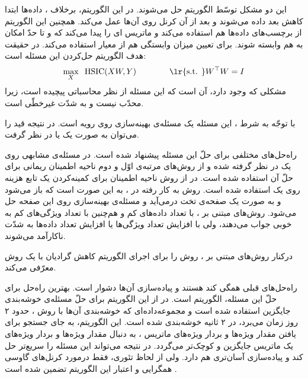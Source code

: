 این دو مشکل توسّط الگوریتم
حل می‌شوند. در این الگوریتم، برخلاف
،
داده‌ها ابتدا کاهش بعد داده می‌شوند و بعد از آن  کرنل روی آن‌ها عمل می‌کند. همچنین این الگوریتم از برچسب‌های داده‌ها هم استفاده می‌کند و ماتریس 
ای
را پیدا می‌کند که 
و
تا حدّ امکان به هم وابسته شوند. برای تعیین میزان وابستگی هم از معیار
\cite{gretton2005measuring} 
استفاده می‌کند. 
\cite{wu2018iterative,fukumizu2009kernel,barshan2011supervised, masaeli2010transformation,scholkopf1998nonlinear,niu2011dimensionality,gangeh2016semi,chang2017clustering,niu2010multiple,song2012feature}
در حقیقت هدف الگوریتم 
حل‌کردن این مسئله است:
\begin{equation}\label{eq1}
\max_X \;\; \HSIC(XW,Y) \qquad \qquad\text{\lr{s.t. }} W^\top W = I
\end{equation}
مشکلی که وجود دارد، آن‌ است که این مسئله از نظر محاسباتی پیچیده است، زیرا محدّب نیست و به شدّت غیرخطّی است. 

با توجّه به شرط
،
این مسئله یک مسئله‌ی بهینه‌سازی روی رویه است. در نتیجه قید را می‌توان به صورت یک
یا
در نظر گرفت. 
\cite{james1976topology,nishimori2005learning,edelman1998geometry}

راه‌حل‌های مختلفی برای حلّ این مسئله پیشنهاد شده است. در
\cite{boumal2011rtrmc} 
مسئله‌ی مشابهی روی یک
در نظر گرفته شده و از روش‌های مرتبه‌ی اوّل و دوم ناحیه اطمینان ریمانی
برای حلّ آن استفاده شده است. در 
\cite{theis2009soft}
از روش ناحیه اطمینان برای کمینه‌کردن یک تابع هزینه روی یک
استفاده شده است. روش به کار رفته در
\cite{wen2013feasible}،
به این صورت است که
باز می‌شود و به صورت یک صفحه‌ی تخت درمی‌آید و مسئله‌ی بهینه‌سازی روی این صفحه حل می‌شود. روش‌های مبتنی بر 
،
با تعداد داده‌های کم و هم‌چنین با تعداد ویژگی‌های کم به خوبی جواب می‌دهند، ولی با افزایش تعداد ویژگی‌ها یا افزایش تعداد داده‌ها به شدّت ناکارآمد می‌شوند.

درکنار روش‌های مبتنی بر
،
\cite{niu2014iterative}
روش
را برای اجرای الگوریتم کاهش گرادیان با یک روش
معرّفی می‌کند.

راه‌حل‌های قبلی همگی کند هستند و پیاده‌سازی آن‌ها دشوار است. بهترین راه‌حل برای حلّ این مسئله، الگوریتم‌
است. در 
\cite{wu2018iterative}
از این الگوریتم برای حلّ مسئله‌ی خوشه‌بندی جایگزین استفاده شده است و مجموعه‌داده‌ای که خوشه‌بندی آن‌ها با روش
،
حدود ۲ روز زمان می‌برد، در ۲ ثانیه خوشه‌بندی شده است.
این الگوریتم، به جای جستجو برای یافتن مقدار ویژه‌ها و بردار ویژه‌های ماتریس
،
به دنبال مقدار ویژه‌ها و بردار ویژه‌های یک ماتریس جایگزین و کوچک‌تر
\lr{$\Phi$}
می‌گردد. در نتیجه 
می‌تواند این مسئله را سریع‌تر حل کند و پیاده‌سازی آسان‌تری هم دارد. ولی از لحاظ تئوری، فقط درمورد کرنل‌های گاوسی همگرایی و اعتبار این الگوریتم تضمین شده است
\cite{wu2018iterative}.

